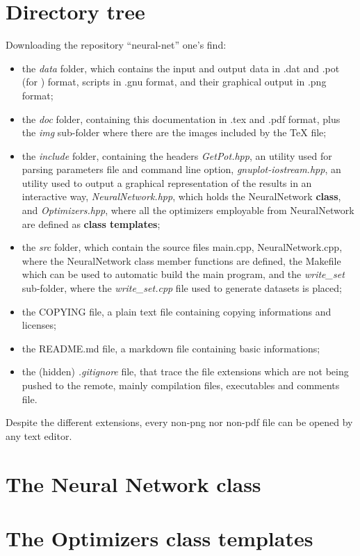\documentclass[12pt, a4paper]{report}
\theoremstyle{definition}
\begin{document}
\section{Directory tree}
Downloading the repository ``neural-net'' one's find:
\begin{itemize}
	\item the \textit{data} folder, which contains the input and output data in .dat and .pot (for \cite{getpot}) format, \cite{gnuplot} scripts in .gnu format, and their graphical output in .png format;
	\item the \textit{doc} folder, containing this documentation in .tex and .pdf format, plus the \textit{img} sub-folder where there are the images included by the TeX file;
	\item the \textit{include} folder, containing the headers \textit{GetPot.hpp}, an utility used for parsing parameters file and command line option, \textit{gnuplot-iostream.hpp}, an utility used to output a graphical representation of the results in an interactive way, \textit{NeuralNetwork.hpp}, which holds the NeuralNetwork \textbf{class}, and \textit{Optimizers.hpp}, where all the optimizers employable from NeuralNetwork are defined as \textbf{class templates};
	\item the \textit{src} folder, which contain the source files main.cpp, NeuralNetwork.cpp, where the NeuralNetwork class member functions are defined, the Makefile which can be used to automatic build the main program, and the \textit{write\_set} sub-folder, where the \textit{write\_set.cpp} file used to generate datasets is placed;
	\item the COPYING file, a plain text file containing copying informations and licenses;
	\item the README.md file, a markdown file containing basic informations;
	\item the (hidden) \textit{.gitignore} file, that trace the file extensions which are not being pushed to the remote, mainly compilation files, executables and comments file.
\end{itemize}
\noindent Despite the different extensions, every non-png nor non-pdf file can be opened by any text editor.
\section{The Neural Network class}
\section{The Optimizers class templates}
\end{document}
